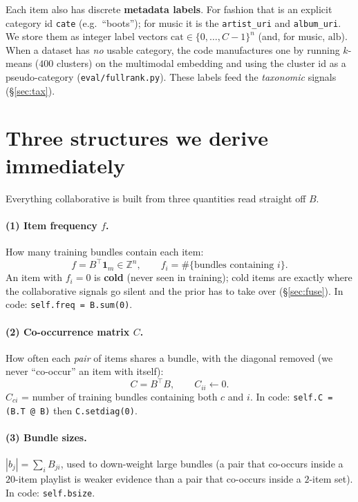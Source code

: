 \documentclass[11pt]{article}
\theoremstyle{remark}
\newcommand{\onevec}{\mathbf{1}}
\newcommand{\code}[1]{\texttt{\small #1}}
\begin{document}
Each item also has discrete \textbf{metadata labels}. For fashion that is an explicit category id \code{cate}
(e.g.\ ``boots''); for music it is the \code{artist\_uri} and \code{album\_uri}. We store them as integer label
vectors $\mathrm{cat}\in\{0,\dots,C-1\}^n$ (and, for music, $\mathrm{alb}$). When a dataset has \emph{no} usable
category, the code manufactures one by running $k$-means ($400$ clusters) on the multimodal embedding and using the
cluster id as a pseudo-category (\code{eval/fullrank.py}). These labels feed the \emph{taxonomic} signals
(\S\ref{sec:tax}).

\section{Three structures we derive immediately}
\label{sec:derived}

Everything collaborative is built from three quantities read straight off $B$.

\paragraph{(1) Item frequency $f$.} How many training bundles contain each item:
\[
  f=B^{\!\top}\onevec_m\in\mathbb{Z}^n,\qquad f_i=\#\{\text{bundles containing }i\}.
\]
An item with $f_i=0$ is \textbf{cold} (never seen in training); cold items are exactly where the collaborative
signals go silent and the prior has to take over (\S\ref{sec:fuse}). In code: \code{self.freq = B.sum(0)}.

\paragraph{(2) Co-occurrence matrix $C$.} How often each \emph{pair} of items shares a bundle, with the diagonal
removed (we never ``co-occur'' an item with itself):
\[
  C=B^{\!\top}B,\qquad C_{ii}\leftarrow 0 .
\]
$C_{ci}$ = number of training bundles containing both $c$ and $i$. In code: \code{self.C = (B.T @ B)} then
\code{C.setdiag(0)}.

\paragraph{(3) Bundle sizes.} $|b_j|=\sum_i B_{ji}$, used to down-weight large bundles (a pair that co-occurs inside
a $20$-item playlist is weaker evidence than a pair that co-occurs inside a $2$-item set). In code: \code{self.bsize}.
\end{document}
